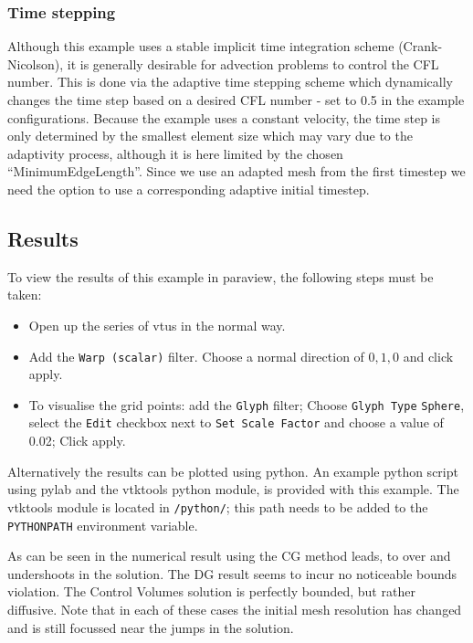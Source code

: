\subsubsection{Time stepping}
Although this example uses a stable implicit time integration scheme (Crank-Nicolson),
it is generally desirable for advection problems to control the CFL number. This is done
via the adaptive time stepping scheme which dynamically changes the time 
step based on a desired CFL number - set to 0.5 in the example configurations. Because the 
example uses a constant velocity, the time step is only determined by the smallest 
element size which may vary due to the adaptivity process, although it is here
limited by the chosen ``MinimumEdgeLength''. Since we use an adapted mesh from the first 
timestep we need the option  to use a corresponding 
adaptive initial timestep.

\subsection{Results}
To view the results of this example in paraview, the following steps
must be taken:
\begin{itemize}
\item Open up the series of vtus in the normal way.
\item Add the \texttt{Warp (scalar)} filter. Choose a normal direction of $0,1,0$ and click apply.
\item To visualise the grid points: add the \texttt{Glyph} filter; Choose \texttt{Glyph Type} \texttt{Sphere},
select the \texttt{Edit} checkbox next to \texttt{Set Scale Factor} and choose a value of 0.02; Click apply.
\end{itemize}

Alternatively the results can be plotted using python. An example python script using pylab and the 
vtktools python module, is provided with this example. The vtktools module is located in 
\texttt{\fluiditysourcepath/python/}; this path needs to be added to the \texttt{PYTHONPATH} environment
variable.

As can be seen in the numerical result using the CG method leads, to over and 
undershoots in the solution. The DG result seems to incur no noticeable bounds
violation. The Control Volumes solution is perfectly bounded, but rather diffusive. Note that in each of 
these cases the initial mesh resolution has changed and is still focussed near the jumps in the solution.

